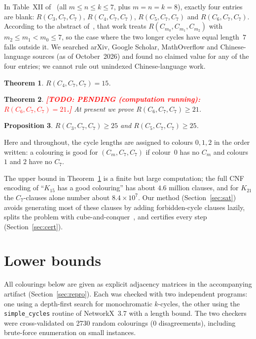 \documentclass[11pt]{amsart}
\newcommand{\TODO}[1]{\textcolor{red}{\textbf{[TODO: #1]}}}
\newtheorem{theorem}{Theorem}
\newtheorem{proposition}[theorem]{Proposition}
\theoremstyle{definition}
\theoremstyle{remark}
\begin{document}
In Table~XII of~\cite{Rad} (all $m\le n\le k\le 7$, plus $m=n=k=8$), exactly four entries are blank:
$R(C_3,C_7,C_7)$, $R(C_4,C_7,C_7)$, $R(C_5,C_7,C_7)$ and $R(C_6,C_7,C_7)$. According to the abstract of~\cite{SunYWLX},
that work treats $R(C_{m_0},C_{m_1},C_{m_2})$ with $m_2\le m_1<m_0\le 7$, so the case where the two longer cycles have equal length~$7$ falls outside it.
We searched arXiv, Google Scholar, MathOverflow and Chinese-language sources (as of October~2026) and found no claimed value for any
of the four entries; we cannot rule out unindexed Chinese-language work.

\begin{theorem}\label{thm:main}
$R(C_4,C_7,C_7)=15$.
\end{theorem}

\begin{theorem}\label{thm:c6}
\TODO{PENDING (computation running): $R(C_6,C_7,C_7)=21$.} At present we prove $R(C_6,C_7,C_7)\ge 21$.
\end{theorem}

\begin{proposition}\label{prop:odd}
$R(C_3,C_7,C_7)\ge 25$ and $R(C_5,C_7,C_7)\ge 25$.
\end{proposition}

Here and throughout, the cycle lengths are assigned to colours $0,1,2$ in the order written: a colouring is good for
$(C_m,C_7,C_7)$ if colour~$0$ has no $C_m$ and colours $1$ and $2$ have no $C_7$.

The upper bound in Theorem~\ref{thm:main} is a finite but large computation; the full CNF encoding of ``$K_{15}$ has a good
colouring'' has about $4.6$ million clauses, and for $K_{21}$ the $C_7$-clauses alone number about $8.4\times10^7$. Our method
(Section~\ref{sec:sat}) avoids generating most of these clauses by adding forbidden-cycle clauses lazily, splits the problem with
cube-and-conquer~\cite{HKWB}, and certifies every step (Section~\ref{sec:cert}).

\section{Lower bounds}\label{sec:lower}

All colourings below are given as explicit adjacency matrices in the accompanying artifact (Section~\ref{sec:repro}). Each was
checked with two independent programs: one using a depth-first search for monochromatic $k$-cycles, the other using the
\texttt{simple\_cycles} routine of NetworkX~3.7 with a length bound. The two checkers were cross-validated on 2730 random colourings
(0 disagreements), including brute-force enumeration on small instances.
\end{document}
